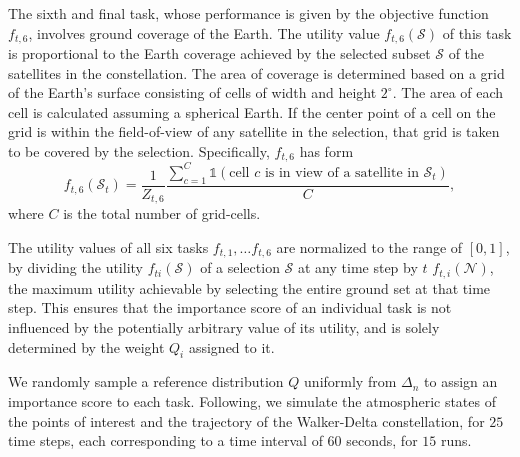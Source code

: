 \documentclass[letter,11pt]{article}
\def\sS{\mathcal{S}}
\def\sN{\mathcal{N}}
\begin{document}
The sixth and final task, whose performance is given by the objective function $f_{t,6}$, involves ground coverage of the Earth. The utility value $f_{t,6}(\sS)$ of this task is proportional to the Earth coverage achieved by the selected subset $\sS$ of the satellites in the constellation. The area of coverage is determined based on a grid of the Earth's surface consisting of cells of width and height $2^\circ$. The area of each cell is calculated assuming a spherical Earth. If the center point of a cell on the grid is within the field-of-view of any satellite in the selection, that grid is taken to be covered by the selection. Specifically, $f_{t,6}$ has form
\begin{equation}
f_{t,6}(\sS_t) = \dfrac{1}{Z_{t,6}} \dfrac{\sum_{c=1}^C \mathbb{1}(\text{cell } c \text{ is in view of a satellite in } \sS_t)}{C},
\end{equation}
where $C$ is the total number of grid-cells. 

The utility values of all six tasks $f_{t,1},\ldots f_{t,6}$ are normalized to the range of $[0, 1]$, by dividing the utility $f_{ti}(\sS)$ of a selection $\sS$ at any time step by $t$ $f_{t,i}(\sN)$, the maximum utility achievable by selecting the entire ground set at that time step. This ensures that the importance score of an individual task is not influenced by the potentially arbitrary value of its utility, and is solely determined by the weight $Q_i$ assigned to it.

We randomly sample a reference distribution $Q$ uniformly from $\Delta_n$ to assign an importance score to each task. Following, we simulate the atmospheric states of the points of interest and the trajectory of the Walker-Delta constellation, for $25$ time steps, each corresponding to a time interval of $60$ seconds, for $15$ runs. 
\end{document}
